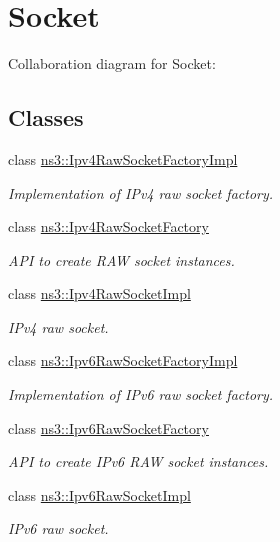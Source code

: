 \hypertarget{group__socket}{}\section{Socket}
\label{group__socket}
Collaboration diagram for Socket\+:
\subsection*{Classes}
\begin{DoxyCompactItemize}
\item 
class \hyperlink{classns3_1_1Ipv4RawSocketFactoryImpl}{ns3\+::\+Ipv4\+Raw\+Socket\+Factory\+Impl}
\begin{DoxyCompactList}\small\item\em Implementation of I\+Pv4 raw socket factory. \end{DoxyCompactList}\item 
class \hyperlink{classns3_1_1Ipv4RawSocketFactory}{ns3\+::\+Ipv4\+Raw\+Socket\+Factory}
\begin{DoxyCompactList}\small\item\em A\+PI to create R\+AW socket instances. \end{DoxyCompactList}\item 
class \hyperlink{classns3_1_1Ipv4RawSocketImpl}{ns3\+::\+Ipv4\+Raw\+Socket\+Impl}
\begin{DoxyCompactList}\small\item\em I\+Pv4 raw socket. \end{DoxyCompactList}\item 
class \hyperlink{classns3_1_1Ipv6RawSocketFactoryImpl}{ns3\+::\+Ipv6\+Raw\+Socket\+Factory\+Impl}
\begin{DoxyCompactList}\small\item\em Implementation of I\+Pv6 raw socket factory. \end{DoxyCompactList}\item 
class \hyperlink{classns3_1_1Ipv6RawSocketFactory}{ns3\+::\+Ipv6\+Raw\+Socket\+Factory}
\begin{DoxyCompactList}\small\item\em A\+PI to create I\+Pv6 R\+AW socket instances. \end{DoxyCompactList}\item 
class \hyperlink{classns3_1_1Ipv6RawSocketImpl}{ns3\+::\+Ipv6\+Raw\+Socket\+Impl}
\begin{DoxyCompactList}\small\item\em I\+Pv6 raw socket. \end{DoxyCompactList}\item 

\end{DoxyCompactItemize}
